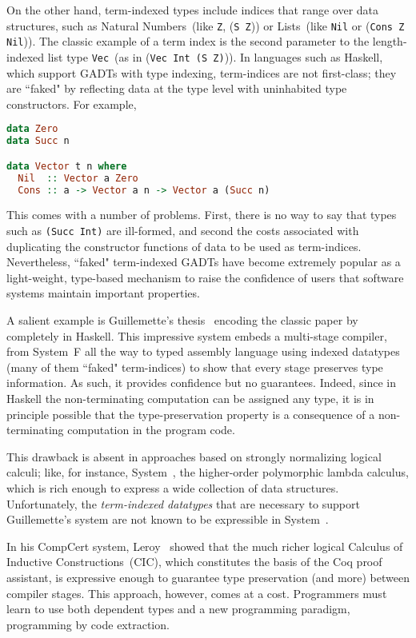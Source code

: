 On the other hand, term-indexed types include indices that range over data
structures, such as Natural Numbers~(like {\tt Z}, {(\tt S
Z})) or Lists~(like {\tt Nil} or ({\tt Cons Z Nil})). 
The classic example of a term index is the second
parameter to the length-indexed list type {\tt Vec}~(as in ({\tt Vec Int
(S Z)})).  In languages such as Haskell, which support GADTs with type indexing,
term-indices are not first-class; they are ``faked" by reflecting data at the
type level with uninhabited type constructors. For example,\vspace*{-1pt}
\begin{lstlisting}[basicstyle={\ttfamily\small},language=Haskell,mathescape]
data Zero
data Succ n

data Vector t n where
  Nil  :: Vector a Zero
  Cons :: a -> Vector a n -> Vector a (Succ n)
\end{lstlisting}\vspace*{-1pt}
This comes with a number of problems. First, there is no way to say
that types such as {\tt (Succ Int)} are ill-formed, and second the costs
associated with duplicating the constructor functions of data to be used
as term-indices.
Nevertheless, ``faked" term-indexed GADTs have become extremely
popular as a light-weight, type-based mechanism
to raise the confidence of users that software systems maintain important
properties.  

A salient example is Guillemette's thesis~\cite{guillemetteThesis}
encoding the classic paper by~\citet{tal-toplas} completely
in Haskell. This impressive system embeds a multi-stage compiler, from
System~F all the way to typed assembly language using indexed datatypes
(many of them ``faked" term-indices) to
show that every stage preserves type information.
%
As such, it provides confidence but no guarantees.  Indeed, since in
Haskell the non-terminating computation can be assigned any type, it is in
principle possible that the type-preservation property is a consequence of
a non-terminating computation in the program code.

This drawback is absent in approaches based on strongly normalizing
logical calculi; like, for instance, System~\Fw, the higher-order
polymorphic lambda calculus, which is rich enough to express a wide
collection of data structures.  Unfortunately, the \emph{term-indexed
datatypes} that are necessary to support Guillemette's system are not
known to be expressible in System~\Fw.

In his CompCert system, Leroy~\cite{Leroy-Compcert-CACM} showed that the
much richer logical Calculus of Inductive Constructions~(CIC), which
constitutes the basis of the Coq proof assistant, is expressive enough to
guarantee type preservation (and more) between compiler stages.  This
approach, however, comes at a cost.  Programmers must learn to use both
dependent types and a new programming paradigm, programming by code
extraction.

